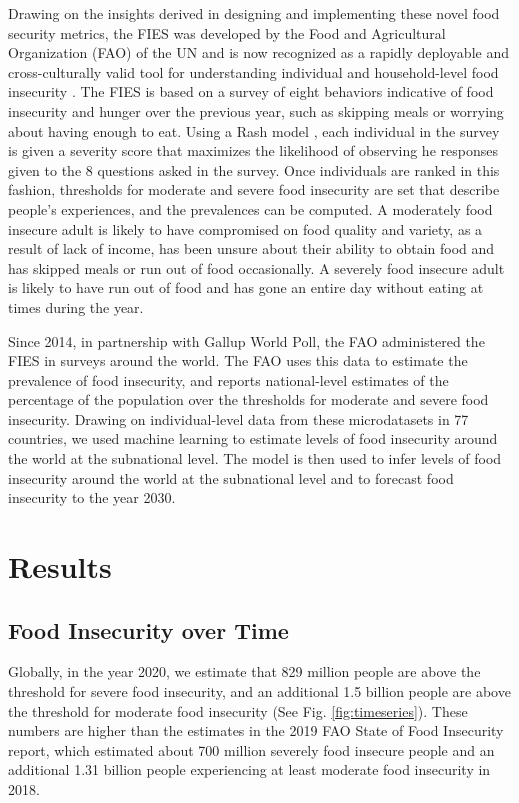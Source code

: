 \documentclass{article}
\begin{document}
Drawing on the insights derived in designing and implementing these novel food security metrics, the FIES was developed by the Food and Agricultural Organization (FAO) of the UN \cite{Ballard2013} and is now recognized as a rapidly deployable and cross-culturally valid tool for understanding individual and household-level food insecurity \citep{wambogo2018validity, smith2017world}.  The FIES is based on a survey of eight behaviors indicative of food insecurity and hunger over the previous year, such as skipping meals or worrying about having enough to eat.  Using a Rash model \citep{Cafiero2018}, each individual in the survey is given a severity score that maximizes the likelihood of observing he responses given to the 8 questions asked in the survey.  Once individuals are ranked in this fashion, thresholds for moderate and severe food insecurity are set that describe people's experiences, and the prevalences can be computed. A moderately food insecure adult is likely to have compromised on food quality and variety, as a result of lack of income, has been unsure about their ability to obtain food and has skipped meals or run out of food occasionally. A severely food insecure adult is likely to have run out of food and has gone an entire day without eating at times during the year.

Since 2014, in partnership with Gallup World Poll, the FAO administered the FIES in surveys around the world. The FAO uses this data to estimate the prevalence of food insecurity, and reports national-level estimates of the percentage of the population over the thresholds for moderate and severe food insecurity.  Drawing on individual-level data from these microdatasets in 77 countries, we used machine learning to estimate levels of food insecurity around the world at the subnational level.  The model is then used to infer levels of food insecurity around the world at the subnational level and to forecast food insecurity to the year 2030.

\section{Results}
\subsection{Food Insecurity over Time}
Globally, in the year 2020, we estimate that 829 million people are above the threshold for severe food insecurity, and an additional 1.5 billion people are above the threshold for moderate food insecurity (See Fig. \ref{fig:timeseries}). These numbers are higher than the estimates in the 2019 FAO State of Food Insecurity report, which estimated about 700 million severely food insecure people and an additional 1.31 billion people experiencing at least moderate food insecurity in 2018. 
\end{document}

